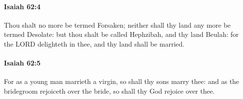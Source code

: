 		\paragraph{Isaiah 62:4} %
			\label{ISAIAH-62-4}

			Thou shalt no more be termed Forsaken; neither shall thy land any more be termed Desolate: but thou shalt be called Hephzibah, and thy land Beulah: for the LORD delighteth in thee, and thy land shall be married.


		\paragraph{Isaiah 62:5} %
			\label{ISAIAH-62-5}

			For as a young man marrieth a virgin, so shall thy sons marry thee: and as the bridegroom rejoiceth over the bride, so shall thy God rejoice over thee.



